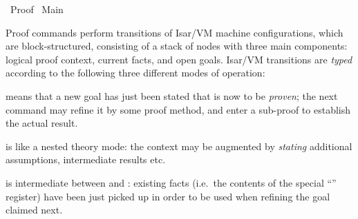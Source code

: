 %
\begin{isabellebody}%
\def\isabellecontext{Proof}%
%
\isadelimtheory
\isanewline
\isanewline
%
\endisadelimtheory
%
\isatagtheory
{}\isamarkupfalse%
\ Proof\isanewline
{}\ Main\isanewline
{}%
\endisatagtheory
{\isafoldtheory}%
%
\isadelimtheory
%
\endisadelimtheory
%
\isamarkuptrue%
%
\begin{isamarkuptext}%
Proof commands perform transitions of Isar/VM machine
  configurations, which are block-structured, consisting of a stack of
  nodes with three main components: logical proof context, current
  facts, and open goals.  Isar/VM transitions are \emph{typed}
  according to the following three different modes of operation:

  \begin{descr}

  \item [\isa{{\isachardoublequote}proof{\isacharparenleft}prove{\isacharparenright}{\isachardoublequote}}] means that a new goal has just been
  stated that is now to be \emph{proven}; the next command may refine
  it by some proof method, and enter a sub-proof to establish the
  actual result.

  \item [\isa{{\isachardoublequote}proof{\isacharparenleft}state{\isacharparenright}{\isachardoublequote}}] is like a nested theory mode: the
  context may be augmented by \emph{stating} additional assumptions,
  intermediate results etc.

  \item [\isa{{\isachardoublequote}proof{\isacharparenleft}chain{\isacharparenright}{\isachardoublequote}}] is intermediate between  and : existing facts (i.e.\
  the contents of the special ``\mbox{}'' register) have been
  just picked up in order to be used when refining the goal claimed
  next.

  \end{descr}


\end{isamarkuptext}
\end{isabellebody}
